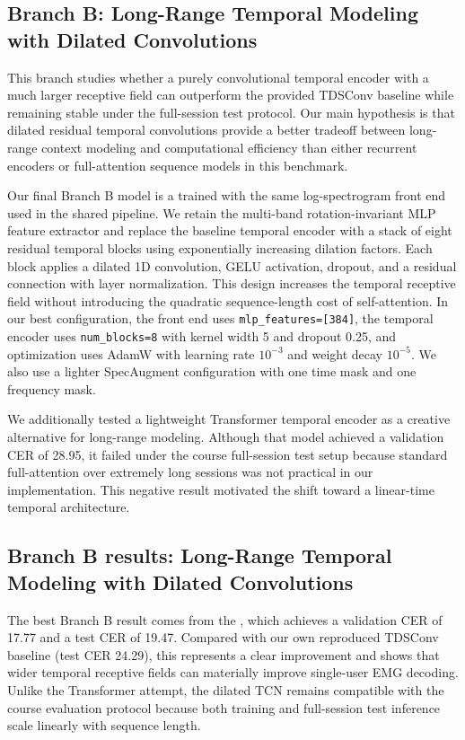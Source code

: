 \subsection{Branch B: Long-Range Temporal Modeling with Dilated Convolutions}
\label{sec:branchB}
This branch studies whether a purely convolutional temporal encoder with a much larger receptive field can outperform the provided TDSConv baseline while remaining stable under the full-session test protocol. Our main hypothesis is that dilated residual temporal convolutions provide a better tradeoff between long-range context modeling and computational efficiency than either recurrent encoders or full-attention sequence models in this benchmark.

Our final Branch B model is a  trained with the same log-spectrogram front end used in the shared pipeline. We retain the multi-band rotation-invariant MLP feature extractor and replace the baseline temporal encoder with a stack of eight residual temporal blocks using exponentially increasing dilation factors. Each block applies a dilated 1D convolution, GELU activation, dropout, and a residual connection with layer normalization. This design increases the temporal receptive field without introducing the quadratic sequence-length cost of self-attention. In our best configuration, the front end uses \texttt{mlp\_features=[384]}, the temporal encoder uses \texttt{num\_blocks=8} with kernel width 5 and dropout 0.25, and optimization uses AdamW with learning rate $10^{-3}$ and weight decay $10^{-5}$. We also use a lighter SpecAugment configuration with one time mask and one frequency mask.

We additionally tested a lightweight Transformer temporal encoder as a creative alternative for long-range modeling. Although that model achieved a validation CER of 28.95, it failed under the course full-session test setup because standard full-attention over extremely long sessions was not practical in our implementation. This negative result motivated the shift toward a linear-time temporal architecture.


\subsection{Branch B results: Long-Range Temporal Modeling with Dilated Convolutions}
The best Branch B result comes from the , which achieves a validation CER of 17.77 and a test CER of 19.47. Compared with our own reproduced TDSConv baseline (test CER 24.29), this represents a clear improvement and shows that wider temporal receptive fields can materially improve single-user EMG decoding. Unlike the Transformer attempt, the dilated TCN remains compatible with the course evaluation protocol because both training and full-session test inference scale linearly with sequence length.

